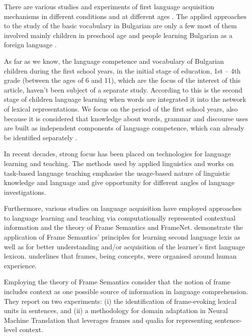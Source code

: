 \documentclass[output=paper,colorlinks,citecolor=brown]{langscibook}
\begin{document}
There are various studies and experiments of first language acquisition mechanisms in different conditions and at different ages \citep{Vulchanovi2021, Stoyanova2014, StengerAvgustinova2021}. The applied approaches to the study of the basic vocabulary in Bulgarian are only a few most of them involved mainly children in preschool age \citep{Popova:20, Andonova2021} and people learning Bulgarian as a foreign language \citep{Dimchev2005, Nisheva2013, Burov2000}.

As far as we know, the language competence and vocabulary of Bulgarian children during the first school years, in the initial stage of education, 1st -- 4th grade (between the ages of 6 and 11), which are the focus of the interest of this article, haven’t been subject of a separate study. According to \citet[682]{Vulchanovaetal:2020}  this is the second stage of children language learning when  words are integrated it into the network of lexical representations. We focus on the  period of the first school years, also because it is considered that knowledge about words, grammar and discourse uses are built as independent components of language competence, which can already be identified separately \citep{Vulchanovi2021}.

In recent decades, strong focus has been placed on technologies for language learning and teaching. The methods used by applied linguistics \citep{Carter1998} and works on task-based language teaching \citep{Dalpanagioti:21, DolgovaTyler:19} emphasise the usage-based nature of linguistic knowledge and language and give opportunity for different angles of language investigations. 

Furthermore, various studies on language acquisition have employed appro\-aches to language learning and teaching via computationally represented contextual information and the theory of Frame Semantics and FrameNet. \citet{Jódar-Sánchez:2018} demonstrate the application of Frame Semantics' principles for learning second language lexis as well as for better understanding and/or acquisition of the learner’s first language lexicon. \citet{Blanco:2006} underlines that frames, being concepts, were organised around human experience.

Employing the theory of Frame Semantics \citet{Torrentetal:22} consider that the notion of frame includes context as one possible source of information in language comprehension. They report on two experiments: (i) the identification of frame-evoking lexical units in sentences, and (ii) a methodology for domain adaptation in Neural Machine Translation that leverages frames and qualia for representing sentence-level context.
\end{document}
